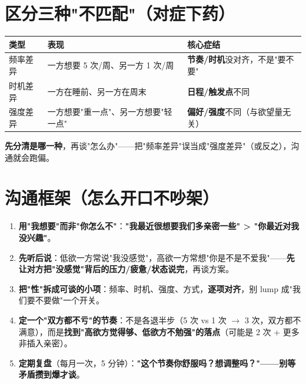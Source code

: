 \documentclass[12pt,UTF8,openany]{ctexbook}
\begin{document}
\section{区分三种"不匹配"（对症下药）}
\begin{tabularx}{\textwidth}{X X X}
\toprule
\textbf{类型} & \textbf{表现} & \textbf{核心症结} \\
\midrule
频率差异 & 一方想要 5 次/周、另一方 1 次/周 & \textbf{节奏/时机}没对齐，不是"要不要" \\
时机差异 & 一方在睡前、另一方在周末 & \textbf{日程/触发点}不同 \\
强度差异 & 一方想要"重一点"、另一方想要"轻一点" & \textbf{偏好/强度}不同（与欲望量无关） \\
\bottomrule
\end{tabularx}
\par\smallskip
\textbf{先分清是哪一种}，再谈"怎么办"——把"频率差异"误当成"强度差异"（或反之），沟通就会跑偏。

\section{沟通框架（怎么开口不吵架）}
\begin{enumerate}[leftmargin=2em,itemsep=0.3em]
  \item \textbf{用"我想要"而非"你怎么不"}：\textbf{"我最近很想要我们多亲密一些" > "你最近对我没兴趣"}。
  \item \textbf{先听后说}：低欲一方常说"我没感觉"，高欲一方常想"你是不是不爱我"——\textbf{先让对方把"没感觉"背后的压力/疲惫/状态说完}，再谈方案。
  \item \textbf{把"性"拆成可谈的小项}：频率、时机、强度、方式，\textbf{逐项对齐}，别 lump 成"我们要不要做"一个开关。
  \item \textbf{定一个"双方都不亏"的节奏}：不是各退半步（5 次 vs 1 次 $\to$ 3 次，双方都不满意），而是\textbf{找到"高欲方觉得够、低欲方不勉强"的落点}（可能是 2 次 + 更多非插入亲密）。
  \item \textbf{定期复盘}（每月一次，5 分钟）：\textbf{"这个节奏你舒服吗？想调整吗？"——别等矛盾攒到爆才谈}。
\end{enumerate}
\end{document}
